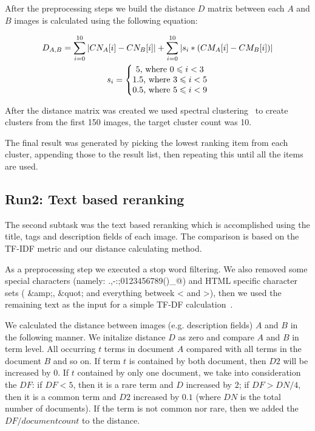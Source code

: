 \documentclass{sig-alternate}
\begin{document}
After the preprocessing steps we build the distance $D$ matrix between each $A$ and $B$ images is calculated using the following equation:

\begin{gather*} 
D_{A,B} = \sum_{i=0}^{10}  \left | CN_{A}[i]-CN_{B}[i] \right | +\sum_{i=0}^{10} \left | s_i * (CM_{A}[i]-CM_{B}[i]) \right |\\
s_i = \left\{\begin{matrix}
5 \textup{, where }0 \leqslant  i < 3\\ 
1.5 \textup{, where }3 \leqslant  i < 5\\ 
0.5 \textup{, where }5 \leqslant  i < 9
\end{matrix}\right.
\end{gather*}


After the distance matrix was created we used spectral clustering~\cite{Ma2009,Ng01onspectral} to create clusters from the first 150 images, the target cluster count was 10. 

The final result was generated by picking the lowest ranking item from each cluster, appending those to the result list, then repeating this until all the items are used.

\subsection{Run2: Text based reranking}
The second subtask was the text based reranking which is accomplished using the title, tags and description fields of each image. The comparison is based on the TF-IDF metric and our distance calculating method.

As a preprocessing step we executed a stop word filtering. We also removed some special characters (namely: .,-:;0123456789()\_@) and HTML specific character sets ( \&amp;, \&quot; and everything betweek < and >), then we used the remaining text as the input for a simple TF-DF calculation~\cite{Yeh2008}. 

 We calculated the distance between images (e.g. description fields) $A$ and $B$ in the following manner. We initalize distance $D$ as zero and compare $A$ and $B$ in term level. All occurring $t$ terms in document $A$ compared with all terms in the document $B$ and so on. If term $t$ is contained by both document, then $D2$ will be increased by $0$. If $t$ contained by only one document, we take into consideration the $DF$: if $DF<5$, then it is a rare term and $D$ increased by $2$; if $DF>DN/4$, then it is a common term and  $D2$ increased by $0.1$ (where $DN$ is the total number of documents). If the term is not common nor rare, then we added the $DF/document count$ to the distance.
\end{document}
